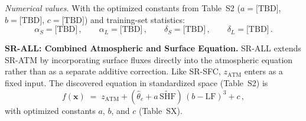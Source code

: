 \vspace{0.3em}
\noindent\textit{Numerical values.}  With the optimized constants from
Table~S2 ($a = \text{[TBD]}$, $b = \text{[TBD]}$, $c = \text{[TBD]}$)
and training-set statistics:
%
\begin{equation*}
  \alpha_S = \text{[TBD]}\,,\qquad
  \alpha_L = \text{[TBD]}\,,\qquad
  \delta_S = \text{[TBD]}\,,\qquad
  \delta_L = \text{[TBD]}\,.
\end{equation*}


\vspace{1.0em}
\textbf{SR-ALL: Combined Atmospheric and Surface Equation.}
SR-ALL extends SR-ATM by incorporating surface fluxes directly into the
atmospheric equation rather than as a separate additive correction.  Like
SR-SFC, $z_{\mathrm{ATM}}$ enters as a fixed input.  The discovered equation
in standardized space (Table~S2) is
%
\begin{equation}
  f(\mathbf{x}) \;=\; z_{\mathrm{ATM}}
    + (\hat{\theta}_e + a\,\widetilde{\mathrm{SHF}})\,(b - \mathrm{LF})^3
    + c\,,
  \label{eq:s-srall-std}
\end{equation}
%
with optimized constants $a$, $b$, and $c$ (Table~SX).

